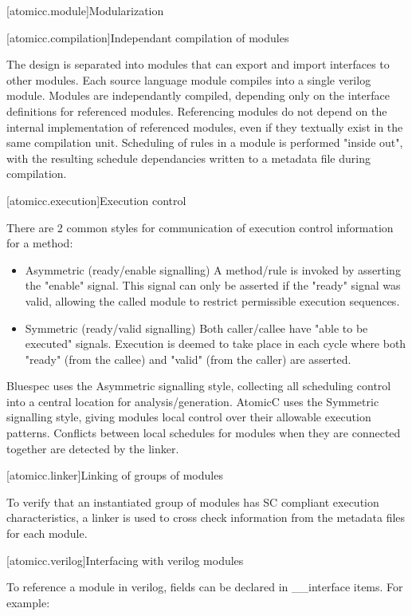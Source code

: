 [atomicc.module]{Modularization}

[atomicc.compilation]{Independant compilation of modules}

The design is separated into modules that can export and import interfaces to other modules.
Each source language module compiles into a single verilog module.  Modules are independantly
compiled, depending only on the interface definitions for referenced modules.
Referencing modules do not depend on the internal implementation of referenced modules,
even if they textually exist in the same compilation unit.
Scheduling of rules in a module is performed "inside out", with the resulting schedule dependancies written to a metadata file during compilation.

[atomicc.execution]{Execution control}

There are 2 common styles for communication of execution control information for a method:
\begin{itemize}
\item Asymmetric (ready/enable signalling)
A method/rule is invoked by asserting the "enable" signal.  This signal can only be
asserted if the "ready" signal was valid, allowing the called module to restrict
permissible execution sequences.

\item Symmetric (ready/valid signalling)
Both caller/callee have "able to be executed" signals.  Execution is deemed to take
place in each cycle where both "ready" (from the callee) and "valid" (from the caller)
are asserted.
\end{itemize}

Bluespec uses the Asymmetric signalling style, collecting all scheduling control into a central location for analysis/generation.
AtomicC uses the Symmetric signalling style, giving modules local control over their allowable execution patterns.  Conflicts between local schedules for modules when they are connected together are detected by the linker.

[atomicc.linker]{Linking of groups of modules}

To verify that an instantiated group of modules has SC compliant execution characteristics, a linker is used to cross check information from the metadata files for each module.

[atomicc.verilog]{Interfacing with verilog modules}

To reference a module in verilog, fields can be declared in __interface items.
For example:

